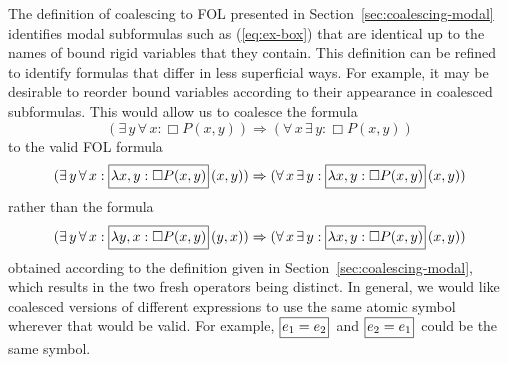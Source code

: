 \documentclass{easychair}
\renewcommand{\implies}{\Rightarrow}
\newcommand{\B}[1]{\framebox{\rule{0pt}{.6em}\ensuremath{\!\tlachars #1\!}}\,}
\let\tlachars\relax
\def\A{\forall\,}
\def\E{\exists\,}
\newcommand{\TRUE}{\mbox{\sc true}}
\begin{document}
The definition of coalescing to FOL presented in
Section~\ref{sec:coalescing-modal} identifies modal subformulas such as
(\ref{eq:ex-box}) that are identical up to the names of bound rigid variables
that they contain. This definition can be refined to identify formulas that
differ in less superficial ways.
For example, it may be desirable to reorder bound variables according to their
appearance in coalesced subformulas. This would allow us to coalesce the formula
\[
  (\E y\, \A x : \Box P(x,y)) \implies (\A x\, \E y : \Box P(x,y))
\]
to the valid FOL formula
\[
  (\E y\, \A x : \B{\lambda x,y : \Box P(x,y)}(x,y)) \implies
  (\A x\, \E y : \B{\lambda x,y : \Box P(x,y)}(x,y))
\]
rather than the formula
\[
  (\E y\, \A x : \B{\lambda y,x : \Box P(x,y)}(y,x)) \implies
  (\A x\, \E y : \B{\lambda x,y : \Box P(x,y)}(x,y))
\] obtained according to the definition given in
Section~\ref{sec:coalescing-modal}, which results in the two fresh
operators being distinct.  In general, we would like coalesced
versions of different expressions to use the same atomic symbol
wherever that would be valid.  For example,
$\B{e_{1}=e_{2}}$ and $\B{e_{2}=e_{1}}$ could be the same symbol.
%
%
\end{document}
